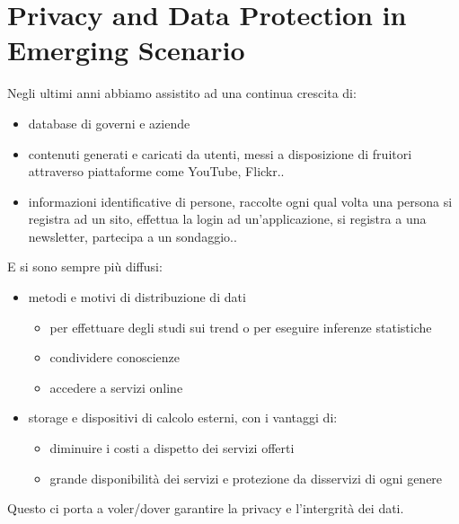 \section{Privacy and Data Protection in Emerging Scenario}
Negli ultimi anni abbiamo assistito ad una continua crescita di:
\begin{itemize}
    \item database di governi e aziende
    \item contenuti generati e caricati da utenti, messi a disposizione di fruitori attraverso piattaforme come YouTube, Flickr..
    \item informazioni identificative di persone, raccolte ogni qual volta una persona si registra ad un sito, effettua la login ad un'applicazione, si registra a una newsletter, partecipa a un sondaggio..
\end{itemize}
E si sono sempre più diffusi:
\begin{itemize}
    \item metodi e motivi di distribuzione di dati 
    \begin{itemize}
        \item per effettuare degli studi sui trend o per eseguire inferenze statistiche
        \item condividere conoscienze
        \item accedere a servizi online
    \end{itemize}
    \item storage e dispositivi di calcolo esterni, con i vantaggi di:
    \begin{itemize}
        \item diminuire i costi a dispetto dei servizi offerti
        \item grande disponibilità dei servizi e protezione da disservizi di ogni genere 
    \end{itemize}
\end{itemize}
Questo ci porta a voler/dover garantire la privacy e l'intergrità dei dati.

